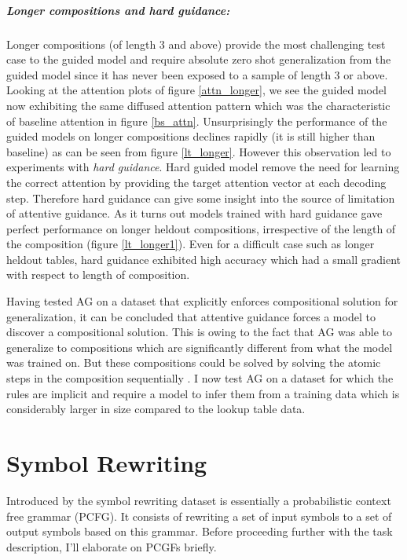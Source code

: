 \subparagraph{Longer compositions and hard guidance:} Longer compositions (of length 3 and above) provide the most challenging test case to the guided model and require absolute zero shot generalization from the guided model since it has never been exposed to a sample of length 3 or above. Looking at the attention plots of figure \ref{attn_longer}, we see the guided model now exhibiting the same diffused attention pattern which was the characteristic of baseline attention in figure \ref{bs_attn}. Unsurprisingly the performance of the guided models on longer compositions declines rapidly (it is still higher than baseline) as can be seen from figure \ref{lt_longer}.
However this observation led to experiments with \textit{hard guidance}. Hard guided model remove the need for learning the correct attention by providing the target attention vector at each decoding step. Therefore hard guidance can give some insight into the source of limitation of attentive guidance. As it turns out models trained with hard guidance gave perfect performance on longer heldout compositions, irrespective of the length of the composition (figure \ref{lt_longer1}). Even for a difficult case such as longer heldout tables, hard guidance exhibited high accuracy which had a small gradient with respect to length of composition.

Having tested AG on a dataset that explicitly enforces compositional solution for generalization, it can be concluded that attentive guidance forces a model to discover a compositional solution. This is owing to the fact that AG was able to generalize to compositions which are significantly different from what the model was trained on. But these compositions could be solved by solving the atomic steps in the composition sequentially . I now test AG on a dataset for which the rules are implicit and require a model to infer them from a training data which is considerably larger in size compared to the lookup table data. 



\section{Symbol Rewriting} \label{datasets:sr}
Introduced by \cite{Weber2018} the symbol rewriting dataset is essentially a probabilistic context free grammar (PCFG). It consists of rewriting a set of input symbols to a set of output symbols based on this grammar. Before proceeding further with the task description, I'll elaborate on PCGFs briefly.


